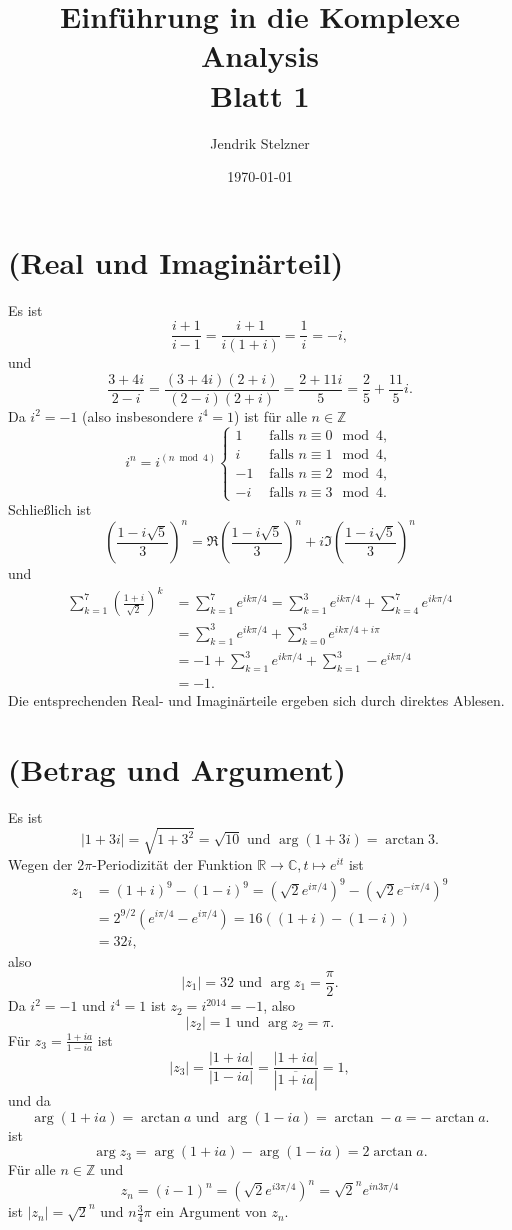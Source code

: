 \documentclass[a4paper,10pt]{article}
\title{\sc Einführung in die Komplexe Analysis \\ \Large Blatt 1}
\author{Jendrik Stelzner}
\date{\today}
\theoremstyle{definition}
\newcommand{\Z}{\mathbb{Z}}
\newcommand{\R}{\mathbb{R}}
\newcommand{\C}{\mathbb{C}}
\begin{document}
\maketitle





\section{(Real und Imaginärteil)}
Es ist
\[
 \frac{i+1}{i-1} = \frac{i+1}{i(1+i)} = \frac{1}{i} = -i,
\]
und
\[
 \frac{3+4i}{2-i} = \frac{(3+4i)(2+i)}{(2-i)(2+i)} = \frac{2+11i}{5} = \frac{2}{5} + \frac{11}{5}i.
\]
Da $i^2 = -1$ (also insbesondere $i^4 = 1$) ist für alle $n \in \Z$
\[
 i^n =
 i^{(n \bmod 4)}
 \begin{cases}
   1 & \text{ falls } n \equiv 0 \mod 4, \\
   i & \text{ falls } n \equiv 1 \mod 4, \\
  -1 & \text{ falls } n \equiv 2 \mod 4, \\
  -i & \text{ falls } n \equiv 3 \mod 4.
 \end{cases}
\]
Schließlich ist
\[
 \left(\frac{1-i\sqrt{5}}{3}\right)^n
 = \Re \left(\frac{1-i\sqrt{5}}{3}\right)^n + i \Im \left(\frac{1-i\sqrt{5}}{3}\right)^n
\]
und
\begin{align*}
 \sum_{k=1}^7 \left(\frac{1+i}{\sqrt{2}}\right)^k
 &= \sum_{k=1}^7 e^{ik\pi/4}
 = \sum_{k=1}^3 e^{ik\pi/4} + \sum_{k=4}^7 e^{ik\pi/4} \\
 &= \sum_{k=1}^3 e^{ik\pi/4} + \sum_{k=0}^3 e^{ik\pi/4+i\pi} \\
 &= -1 + \sum_{k=1}^3 e^{ik\pi/4} + \sum_{k=1}^3 -e^{ik\pi/4} \\
 &= -1.
\end{align*}
Die entsprechenden Real- und Imaginärteile ergeben sich durch direktes Ablesen.





\section{(Betrag und Argument)}
Es ist
\[
 |1+3i| = \sqrt{1+3^2} = \sqrt{10} \text{ und } \arg (1+3i) = \arctan 3.
\]
Wegen der $2\pi$-Periodizität der Funktion $\R \to \C, t \mapsto e^{it}$ ist
\begin{align*}
 z_1
 &= (1+i)^9 - (1-i)^9
 = \left(\sqrt{2}e^{i\pi/4}\right)^9 - \left(\sqrt{2}e^{-i\pi/4}\right)^9 \\
 &= 2^{9/2} (e^{i\pi/4}-e^{i\pi/4})
 = 16 ((1+i)-(1-i)) \\
 &= 32i,
\end{align*}
also
\[
 |z_1| = 32 \text{ und } \arg z_1 = \frac{\pi}{2}.
\]
Da $i^2 = -1$ und $i^4 = 1$ ist $ z_2 = i^{2014} = -1$, also
\[
 |z_2| = 1 \text{ und } \arg z_2 = \pi.
\]
Für $z_3 = \frac{1+ia}{1-ia}$ ist
\[
 \left|z_3\right|
 = \frac{|1+ia|}{|1-ia|}
 = \frac{|1+ia|}{\left|\overline{1+ia}\right|}
 = 1,
\]
und da
\[
 \arg (1+ia) = \arctan a \text{ und } \arg (1-ia) = \arctan -a = - \arctan a.
\]
ist
\[
 \arg z_3 = \arg (1+ia) - \arg (1-ia) = 2 \arctan a.
\]
Für alle $n \in \Z$ und
\[
 z_n = (i-1)^n = \left(\sqrt{2}e^{i3\pi/4}\right)^n = \sqrt{2}^n e^{in3\pi/4}
\]
ist $|z_n| = \sqrt{2}^n$ und $n\frac{3}{4}\pi$ ein Argument von $z_n$.
\end{document}
